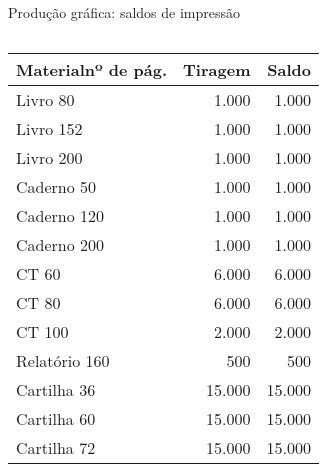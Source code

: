 \documentclass{beamer}
\begin{document}
\begin{frame}{Produção gráfica: saldos de impressão}
\begin{columns}[T]
\begin{column}{0.48\textwidth}
			{\tiny
			\begin{tabular}{lrr}
				\hline
				\textbf{Material\/nº de pág.} & \textbf{Tiragem} & \textbf{Saldo} \\
				\hline
				Livro 80 & 1.000 & 1.000 \\
				Livro 152 & 1.000 & 1.000 \\
				Livro 200 & 1.000 & 1.000 \\
				Caderno 50 & 1.000 & 1.000 \\
				Caderno 120 & 1.000 & 1.000 \\
				Caderno 200 & 1.000 & 1.000 \\
				CT 60 & 6.000 & 6.000 \\
				CT 80 & 6.000 & 6.000 \\
				CT 100 & 2.000 & 2.000 \\
				Relatório 160 & 500 & 500 \\
				Cartilha 36 & 15.000 & 15.000 \\
				Cartilha 60 & 15.000 & 15.000 \\
				Cartilha 72 & 15.000 & 15.000 \\
				\hline
			\end{tabular}}
		\end{column}
	\end{columns}
\end{frame}
\end{document}
